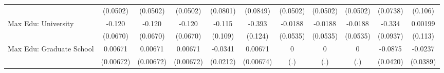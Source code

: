 {\begin{tabular}{l*{10}{c}}
            &    (0.0502)         &    (0.0502)         &    (0.0502)         &    (0.0801)         &    (0.0849)         &    (0.0502)         &    (0.0502)         &    (0.0502)         &    (0.0738)         &     (0.106)         \\
\addlinespace
Max Edu: University&      -0.120         &      -0.120         &      -0.120         &      -0.115         &      -0.393\sym{**} &     -0.0188         &     -0.0188         &     -0.0188         &      -0.334\sym{***}&     0.00199         \\
            &    (0.0670)         &    (0.0670)         &    (0.0670)         &     (0.109)         &     (0.124)         &    (0.0535)         &    (0.0535)         &    (0.0535)         &    (0.0937)         &     (0.113)         \\
\addlinespace
Max Edu: Graduate School&     0.00671         &     0.00671         &     0.00671         &     -0.0341         &     0.00671         &           0         &           0         &           0         &     -0.0875\sym{*}  &     -0.0237         \\
            &   (0.00672)         &   (0.00672)         &   (0.00672)         &    (0.0212)         &   (0.00674)         &         (.)         &         (.)         &         (.)         &    (0.0420)         &    (0.0389)         \\
\bottomrule
\end{tabular}
}
